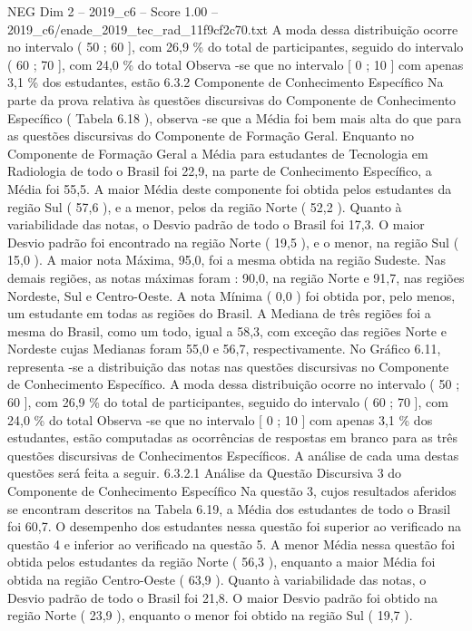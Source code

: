 \begin{textsample}{NEG Dim 2 – 2019\_c6 – Score 1.00 – 2019\_c6/enade\_2019\_tec\_rad\_11f9cf2c70.txt}
A moda dessa distribuição ocorre no intervalo ( 50 ; 60 ], com 26,9 \% do total de participantes, seguido do intervalo ( 60 ; 70 ], com 24,0 \% do total Observa -se que no intervalo [ 0 ; 10 ] com apenas 3,1 \% dos estudantes, estão 6.3.2 Componente de Conhecimento Específico Na parte da prova relativa às questões discursivas do Componente de Conhecimento Específico ( Tabela 6.18 ), observa -se que a Média foi bem mais alta do que para as questões discursivas do Componente de Formação Geral.
Enquanto no Componente de Formação Geral a Média para estudantes de Tecnologia em Radiologia de todo o Brasil foi 22,9, na parte de Conhecimento Específico, a Média foi 55,5.
A maior Média deste componente foi obtida pelos estudantes da região Sul ( 57,6 ), e a menor, pelos da região Norte ( 52,2 ).
Quanto à variabilidade das notas, o Desvio padrão de todo o Brasil foi 17,3.
O maior Desvio padrão foi encontrado na região Norte ( 19,5 ), e o menor, na região Sul ( 15,0 ).
A maior nota Máxima, 95,0, foi a mesma obtida na região Sudeste.
Nas demais regiões, as notas máximas foram : 90,0, na região Norte e 91,7, nas regiões Nordeste, Sul e Centro-Oeste.
A nota Mínima ( 0,0 ) foi obtida por, pelo menos, um estudante em todas as regiões do Brasil.
A Mediana de três regiões foi a mesma do Brasil, como um todo, igual a 58,3, com exceção das regiões Norte e Nordeste cujas Medianas foram 55,0 e 56,7, respectivamente.
No Gráfico 6.11, representa -se a distribuição das notas nas questões discursivas no Componente de Conhecimento Específico.
A moda dessa distribuição ocorre no intervalo ( 50 ; 60 ], com 26,9 \% do total de participantes, seguido do intervalo ( 60 ; 70 ], com 24,0 \% do total Observa -se que no intervalo [ 0 ; 10 ] com apenas 3,1 \% dos estudantes, estão computadas as ocorrências de respostas em branco para as três questões discursivas de Conhecimentos Específicos.
A análise de cada uma destas questões será feita a seguir. 6.3.2.1 Análise da Questão Discursiva 3 do Componente de Conhecimento Específico Na questão 3, cujos resultados aferidos se encontram descritos na Tabela 6.19, a Média dos estudantes de todo o Brasil foi 60,7.
O desempenho dos estudantes nessa questão foi superior ao verificado na questão 4 e inferior ao verificado na questão 5.
A menor Média nessa questão foi obtida pelos estudantes da região Norte ( 56,3 ), enquanto a maior Média foi obtida na região Centro-Oeste ( 63,9 ).
Quanto à variabilidade das notas, o Desvio padrão de todo o Brasil foi 21,8.
O maior Desvio padrão foi obtido na região Norte ( 23,9 ), enquanto o menor foi obtido na região Sul ( 19,7 ).

\end{textsample}
